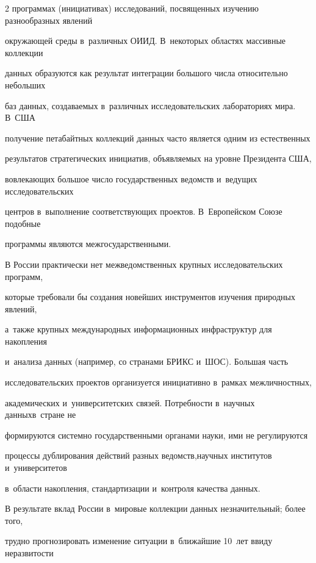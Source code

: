\begin{multicols}{2}
программах (инициативах) исследований, посвященных изучению разнообразных явлений 


окружающей среды в~различных ОИИД. В~некоторых областях массивные коллекции 


данных образуются как результат интеграции большого числа относительно небольших 


баз данных, создаваемых в~различных исследовательских лабораториях мира. В~США 


получение петабайтных коллекций данных часто является одним из естественных 


результатов стратегических инициатив, объявляемых на уровне Президента США, 


вовлекающих большое число государственных ведомств и~ведущих исследовательских 


центров в~выполнение соответствующих проектов. В~Европейском Союзе подобные 


программы являются межгосударственными. 


  


  В России практически нет межведомственных крупных исследовательских программ, 


которые требовали бы создания новейших инструментов изучения природных явлений, 


а~также крупных международных информационных инфраструктур для накопления 


и~анализа данных (например, со странами БРИКС и~ШОС). Большая часть 


исследовательских проектов организуется инициативно в~рамках межличностных, 


академических и~университетских связей. Потребности в~научных данных\linebreak в~стране не 


формируются системно государственными органами науки, ими не регулируются 


процессы дублирования действий разных ведомств,\linebreak научных институтов и~университетов 


в~области накопления, стандартизации и~контроля качества данных.


  


  В результате вклад России в~мировые коллекции данных незначительный; более того, 


трудно прогнозировать изменение ситуации в~{ближайшие} 10~лет ввиду неразвитости 



\end{multicols}
